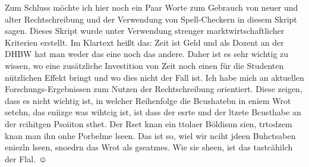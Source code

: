 Zum Schluss möchte ich hier noch ein Paar Worte zum Gebrauch von neuer und alter
Rechtschreibung und der Verwendung von Spell-Checkern in diesem Skript sagen.
Dieses Skript wurde unter Verwendung strenger marktwirtschaftlicher Kriterien
erstellt.  Im Klartext heißt das: Zeit ist Geld und als Dozent an der DHBW hat man
weder das eine noch das andere.  Daher ist es sehr wichtig zu wissen, wo eine
zusätzliche Investition von Zeit noch einen für die Studenten nützlichen Effekt
bringt und wo dies nicht der Fall ist.  Ich habe mich an aktuellen
Forschungs-Ergebnissen zum Nutzen der Rechtschreibung orientiert. Diese zeigen,
dass es nicht wichtig ist, in welcher Reihenfolge die Bcushatebn in eniem Wrot
setehn, das eniizge was wihtcig ist, ist dass der esrte und der ltzete Bcusthabe
an der rcihitgen Psoiiton sthet. Der Rset knan ein ttolaer Böldisnn sien,
trtodzem knan man ihn onhe Porbelme lseen. Das ist so, wiel wir nciht jdeen
Buhctsaben eniezln lseen, snoedrn das Wrot als gseatmes.  Wie sie sheen, ist das
tastcähilch der Flal. $\displaystyle\smiley$




